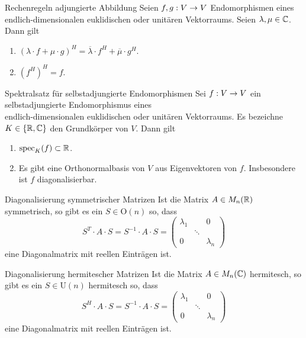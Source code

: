 \documentclass[main.tex]{subfiles}
\begin{document}
\begin{karte}{Rechenregeln adjungierte Abbildung}
    Seien \(f,g : V \rightarrow V\) Endomorphismen eines 
    endlich-dimensionalen euklidischen oder unitären 
    Vektorraums. Seien \( \lambda, \mu\in \mathbb{C} \). Dann 
    gilt 
    \begin{enumerate}
        \item \( (\lambda \cdot f + \mu \cdot g)^H 
        = \overline{\lambda} \cdot f^H + \overline{\mu} \cdot g^H \).
        \item \( (f^H)^H =f \).
    \end{enumerate}
\end{karte}

\begin{karte}{Spektralsatz für selbstadjungierte Endomorphismen}
    Sei \( f : V \rightarrow V \) ein selbstadjungierte Endomorphismus 
    eines \\
    endlich-dimensionalen euklidischen oder unitären 
    Vektorraums. Es bezeichne \( K\in \{\mathbb{R}, \mathbb{C}\} \) 
    den Grundkörper von \(V\). Dann gilt 
    \begin{enumerate}
        \item \( \operatorname{spec}_K(f) \subset \mathbb{R} \).
        \item Es gibt eine Orthonormalbasis von \(V\) 
        aus Eigenvektoren von \(f\). Insbesondere ist 
        \(f\) diagonalisierbar.
    \end{enumerate}
\end{karte}

\begin{karte}{Diagonalisierung symmetrischer Matrizen}
    Ist die Matrix \( A\in M_n(\mathbb{R}) \) symmetrisch, 
    so gibt es ein \( S\in \mathrm{O}(n) \) so, dass 
    \[ S^T \cdot A \cdot S = S^{-1} \cdot A\cdot S 
    = \begin{pmatrix}
        \lambda_1 && 0 \\
        & \ddots & \\
        0 && \lambda_n
    \end{pmatrix} \]
    eine Diagonalmatrix mit reellen Einträgen ist.
\end{karte}

\begin{karte}{Diagonalisierung hermitescher Matrizen}
    Ist die Matrix \( A\in M_n(\mathbb{C}) \) hermitesch, so gibt es 
    ein \( S\in \mathrm{U}(n) \) hermitesch so, dass 
    \[ S^H \cdot A \cdot S = S^{-1} \cdot A \cdot S 
    = \begin{pmatrix}
        \lambda_1 && 0 \\
        & \ddots & \\
        0 && \lambda_n
    \end{pmatrix} \]
    eine Diagonalmatrix mit reellen Einträgen ist.
\end{karte}
\end{document}
